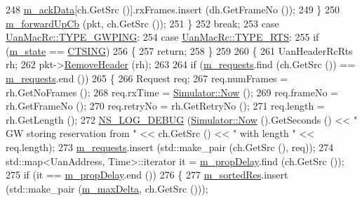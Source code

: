 \begin{DoxyCode}
248             \hyperlink{classns3_1_1UanMacRcGw_a08da08fa5109dcd1147ef2c17aa1f061}{m\_ackData}[ch.GetSrc ()].rxFrames.insert (dh.GetFrameNo ());
249           \}
250         \hyperlink{classns3_1_1UanMacRcGw_ac387b855682d24b25bd9fc21c5c9645c}{m\_forwardUpCb} (pkt, ch.GetSrc ());
251       \}
252       \textcolor{keywordflow}{break};
253     \textcolor{keywordflow}{case} \hyperlink{classns3_1_1UanMacRc_ad12bbd636f03943095e1c81cd1cc24b3a704bedfcbfafb80b9a7d280385e60e8b}{UanMacRc::TYPE\_GWPING}:
254     \textcolor{keywordflow}{case} \hyperlink{classns3_1_1UanMacRc_ad12bbd636f03943095e1c81cd1cc24b3a04488fc6d8b08804abbb178e0af7a6dc}{UanMacRc::TYPE\_RTS}:
255       \textcolor{keywordflow}{if} (\hyperlink{classns3_1_1UanMacRcGw_ac3222d8eea64d77215039f67e90ef96a}{m\_state} == \hyperlink{classns3_1_1UanMacRcGw_a72bafb41afd28b05cb9906d5c1f42e2da01f2fcfc2e9efdccbbc058daa9d2ac44}{CTSING})
256         \{
257           \textcolor{keywordflow}{return};
258         \}
259 
260       \{
261         UanHeaderRcRts rh;
262         pkt->\hyperlink{classns3_1_1Packet_a0961eccf975d75f902d40956c93ba63e}{RemoveHeader} (rh);
263 
264         \textcolor{keywordflow}{if} (\hyperlink{classns3_1_1UanMacRcGw_ace02d765d83abd8ea6513fd7813626e0}{m\_requests}.find (ch.GetSrc ()) == \hyperlink{classns3_1_1UanMacRcGw_ace02d765d83abd8ea6513fd7813626e0}{m\_requests}.end ())
265           \{
266             Request req;
267             req.numFrames = rh.GetNoFrames ();
268             req.rxTime = \hyperlink{classns3_1_1Simulator_ac3178fa975b419f7875e7105be122800}{Simulator::Now} ();
269             req.frameNo = rh.GetFrameNo ();
270             req.retryNo = rh.GetRetryNo ();
271             req.length = rh.GetLength ();
272             \hyperlink{group__logging_ga413f1886406d49f59a6a0a89b77b4d0a}{NS\_LOG\_DEBUG} (\hyperlink{classns3_1_1Simulator_ac3178fa975b419f7875e7105be122800}{Simulator::Now} ().GetSeconds () << \textcolor{stringliteral}{" GW storing
       reservation from "} << ch.GetSrc () << \textcolor{stringliteral}{" with length "} << req.length);
273             \hyperlink{classns3_1_1UanMacRcGw_ace02d765d83abd8ea6513fd7813626e0}{m\_requests}.insert (std::make\_pair (ch.GetSrc (), req));
274             std::map<UanAddress, Time>::iterator it = \hyperlink{classns3_1_1UanMacRcGw_adea1fcd9ce2850a32d2d7ff1f84c5958}{m\_propDelay}.find (ch.GetSrc ());
275             \textcolor{keywordflow}{if} (it == \hyperlink{classns3_1_1UanMacRcGw_adea1fcd9ce2850a32d2d7ff1f84c5958}{m\_propDelay}.end ())
276               \{
277                 \hyperlink{classns3_1_1UanMacRcGw_afe8430ebad788663b695fe54593f5fcf}{m\_sortedRes}.insert (std::make\_pair (\hyperlink{classns3_1_1UanMacRcGw_a5134119f83113902bc01101e46d66542}{m\_maxDelta}, ch.GetSrc ()));

\end{DoxyCode}
